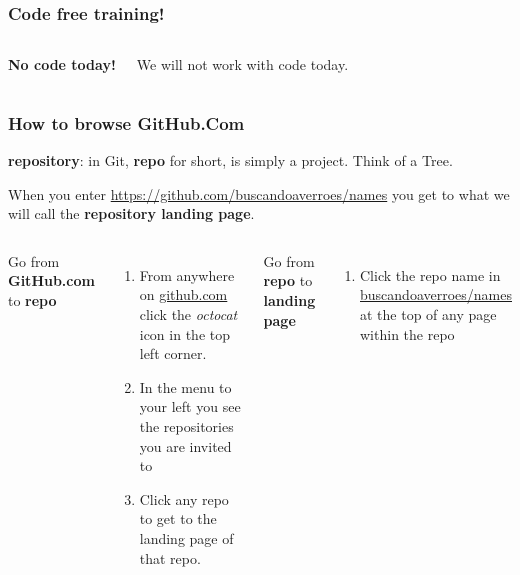 \documentclass[aspectratio=169]{beamer} %
\newcommand{\trainingURL}[1]{{\color{blue}\url{#1}}}
\newcommand{\traininerUsername}{buscandoaverroes}
\newcommand{\repoName}{\traininerUsername/names}
\newcommand{\trainingRepoURL}[1]{\trainingURL{https://github.com/\repoName #1}}
\begin{document}
\begin{frame}
\frametitle{Code free training!}

	\begin{columns}[c]


		\textbf{No code today!}

		\vspace{.5cm}

		We will not work with code today.



	\end{columns}
\end{frame}

\begin{frame}
\frametitle{How to browse GitHub.Com}

	\textbf{repository}: in Git, \textbf{repo} for short, is simply a project. Think of a Tree.
		\vspace{.25cm}

	When you enter \trainingRepoURL{} you get to what we will call the \textbf{repository landing page}.

	\vspace{.25cm}

	\begin{columns}[T]

		Go from \textbf{GitHub.com} to \textbf{repo}
		\begin{enumerate}
			\item From anywhere on \trainingURL{github.com} click the \textit{octocat} icon in the top left corner.
			\item In the menu to your left you see the repositories you are invited to
			\item Click any repo to get to the landing page of that repo.
		\end{enumerate}

		Go from \textbf{repo} to \textbf{landing page}
		\begin{enumerate}
			\item Click the repo name in {\color{blue}\url{\repoName}} at the top of any page within the repo
		\end{enumerate}

	\end{columns}
\end{frame}
\end{document}
